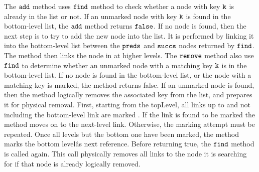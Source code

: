 


The $\tt add$ method uses $\tt find$ method to check whether a node with key $\tt k$ is already in the list or not. If an unmarked node with key $\tt k$ is found in the bottom-level list, the $\tt add$ method returns $\tt false$. If no node is found, then the next step is to try to add the new node into the list. It is performed by linking it into the bottom-level list between the $\tt preds$ and $\tt succs$ nodes returned by $\tt find$. The method then links the node in at higher levels. 
The $\tt remove$ method also use $\tt find$ to determine whether an unmarked node with a matching key $\tt k$ is in the bottom-level list. If no node is found in the bottom-level list, or the node with a matching key is marked, the method returns false. If an unmarked node is found, then the method logically removes the associated key from the list, and prepares it for physical removal. First, starting from the topLevel, all links up to and not including the bottom-level link are marked . If the link is found to be marked the method moves on to the next-level link. Otherwise, the marking attempt must be repeated. Once all levels but the bottom one have been marked, the method marks the bottom levelâs next reference. Before returning true, the $\tt find$ method is called again. This call physically removes all links to the node it is searching for if that node is already logically removed.


